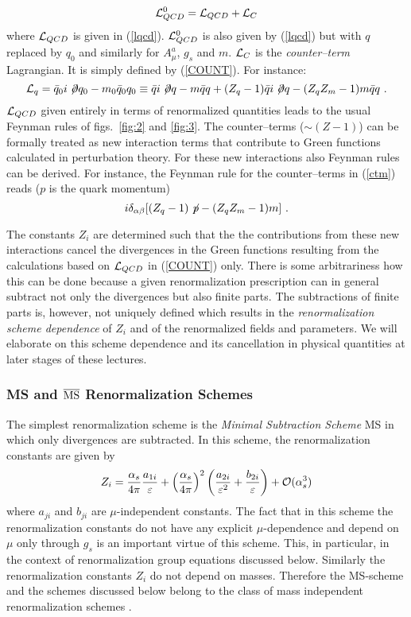 \documentclass[12pt]{article}
\newcommand{\eqn}{\ref}
\newcommand{\be}{\begin{equation}}
\newcommand{\ee}{\end{equation}}
\begin{document}
\begin{itemize}
\be\label{COUNT}
{\cal L}^0_{QCD}={\cal L}_{QCD}+{\cal L}_C
\ee
where ${\cal L}_{QCD}$ is given in (\ref{lqcd}). ${\cal L}^0_{QCD}$ is
also given by (\ref{lqcd}) but with $q$ replaced by $q_0$ and similarly
for $A^a_\mu$, $g_s$ and $m$. ${\cal L}_C$ is the {\it counter--term}
Lagrangian. It is simply defined by
(\ref{COUNT}).
For instance:
\begin{equation}\label{ctm}
{\cal L}_q=\bar q_0 i\not\!\partial q_0-m_0\bar q_0 q_0\equiv
\bar q i\not\!\partial q-m\bar q q+(Z_q-1)\bar q i\not\!\partial q-
(Z_q Z_m-1)m\bar q q~.
\end{equation}
${\cal L}_{QCD}$ given entirely in terms of
renormalized quantities leads to the usual Feynman rules of 
figs.\ \ref{fig:2} and \ref{fig:3}.
The counter--terms ($\sim(Z-1)$) can be formally
treated as new interaction terms that contribute
to Green functions calculated in perturbation theory. 
For these new interactions also Feynman rules can be derived.
For instance, the Feynman rule for the counter--terms in (\eqn{ctm}) reads
($p$ is the quark momentum)
\begin{equation}\label{ctex}
i\delta_{\alpha\beta}\lbrack(Z_q-1)\not\! p - (Z_q Z_m-1) m\rbrack~.   
\end{equation}

The constants $Z_i$ are  determined such that the the contributions
from these new interactions cancel the
divergences in the Green functions resulting from the calculations
based on ${\cal L}_{QCD}$ in (\ref{COUNT}) only.
There is some arbitrariness how this can be done because a given
renormalization prescription can in general subtract not only the
divergences but also finite parts. The subtractions of finite
parts is, however, not uniquely defined which results in  the 
{\it renormalization scheme dependence} of $Z_i$ and of the
renormalized fields and parameters. We will elaborate on this
scheme dependence and its cancellation in physical quantities 
at later stages of these lectures.

\subsubsection{MS and $\overline{\bf \rm MS}$ Renormalization Schemes}
The simplest renormalization scheme is the {\it Minimal Subtraction
Scheme} MS  \cite{HV1} 
in which only divergences are subtracted. In this scheme,
the renormalization constants are given by
\begin{equation}\label{zms}
Z_i = \frac{\alpha_s}{4\pi}\frac{a_{1i}}{\varepsilon} 
+\left(\frac{\alpha_s}{4\pi}\right)^2
 \left(\frac{a_{2i}}{\varepsilon^2}+
 \frac{b_{2i}}{\varepsilon}\right)+{\cal O}(\alpha_s^3) 
\end{equation}
where $a_{ji}$ and $b_{ji}$ are $\mu$-independent constants.
The fact that in this scheme the renormalization constants
do not have any explicit $\mu$-dependence and depend on $\mu$
only through $g_s$ is an important virtue of this scheme.
This, in particular, in the context of renormalization group
equations discussed below. Similarly the renormalization constants
$Z_i$ do not depend on masses. Therefore the MS-scheme and the
schemes discussed below belong to the class of mass independent
renormalization schemes \cite{Weinberg}.


\end{itemize}
\end{document}

